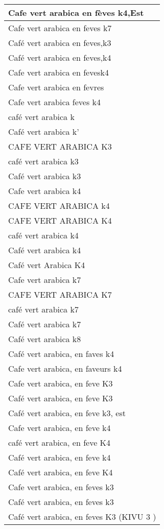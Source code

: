 \documentclass[
]{book}
\begin{document}
\begin{table}
\begin{tabular}[t]{l}
\hline
Cafe vert arabica en fèves k4,Est\\
\hline
Cafe vert arabica en feves k7\\
\hline
Café vert arabica en feves,k3\\
\hline
Café vert arabica en feves,k4\\
\hline
Cafe vert arabica en fevesk4\\
\hline
Cafe vert arabica en fevres\\
\hline
Cafe vert arabica feves k4\\
\hline
café vert arabica k\\
\hline
Café vert arabica k'\\
\hline
CAFE VERT ARABICA K3\\
\hline
café vert arabica k3\\
\hline
Café vert arabica k3\\
\hline
Cafe vert arabica k4\\
\hline
CAFE VERT ARABICA k4\\
\hline
CAFE VERT ARABICA K4\\
\hline
café vert arabica k4\\
\hline
Café vert arabica k4\\
\hline
Café vert Arabica K4\\
\hline
Cafe vert arabica k7\\
\hline
CAFE VERT ARABICA K7\\
\hline
café vert arabica k7\\
\hline
Café vert arabica k7\\
\hline
Café vert arabica k8\\
\hline
Café vert arabica, en faves k4\\
\hline
Cafe vert arabica, en faveurs k4\\
\hline
Cafe vert arabica, en feve K3\\
\hline
Café vert arabica, en feve K3\\
\hline
Café vert arabica, en feve k3, est\\
\hline
Cafe vert arabica, en feve k4\\
\hline
café vert arabica, en feve K4\\
\hline
Café vert arabica, en feve k4\\
\hline
Café vert arabica, en feve K4\\
\hline
Cafe vert arabica, en feves k3\\
\hline
Café vert arabica, en feves k3\\
\hline
Café vert arabica, en feves K3 (KIVU 3 )\\

\end{tabular}
\end{table}
\end{document}

